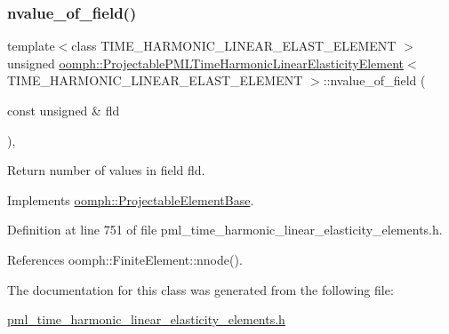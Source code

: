 \subsubsection{\texorpdfstring{nvalue\+\_\+of\+\_\+field()}{nvalue\_of\_field()}}
{\footnotesize\ttfamily template$<$class T\+I\+M\+E\+\_\+\+H\+A\+R\+M\+O\+N\+I\+C\+\_\+\+L\+I\+N\+E\+A\+R\+\_\+\+E\+L\+A\+S\+T\+\_\+\+E\+L\+E\+M\+E\+NT $>$ \\
unsigned \hyperlink{classoomph_1_1ProjectablePMLTimeHarmonicLinearElasticityElement}{oomph\+::\+Projectable\+P\+M\+L\+Time\+Harmonic\+Linear\+Elasticity\+Element}$<$ T\+I\+M\+E\+\_\+\+H\+A\+R\+M\+O\+N\+I\+C\+\_\+\+L\+I\+N\+E\+A\+R\+\_\+\+E\+L\+A\+S\+T\+\_\+\+E\+L\+E\+M\+E\+NT $>$\+::nvalue\+\_\+of\+\_\+field (\begin{DoxyParamCaption}\item[{const unsigned \&}]{fld }\end{DoxyParamCaption})\hspace{0.3cm}{\ttfamily [inline]}, {\ttfamily [virtual]}}



Return number of values in field fld. 



Implements \hyperlink{classoomph_1_1ProjectableElementBase_a1a9a6de16f3511bca8e8be770abb9c2e}{oomph\+::\+Projectable\+Element\+Base}.



Definition at line 751 of file pml\+\_\+time\+\_\+harmonic\+\_\+linear\+\_\+elasticity\+\_\+elements.\+h.



References oomph\+::\+Finite\+Element\+::nnode().



The documentation for this class was generated from the following file\+:\begin{DoxyCompactItemize}
\item 
\hyperlink{pml__time__harmonic__linear__elasticity__elements_8h}{pml\+\_\+time\+\_\+harmonic\+\_\+linear\+\_\+elasticity\+\_\+elements.\+h}\end{DoxyCompactItemize}
